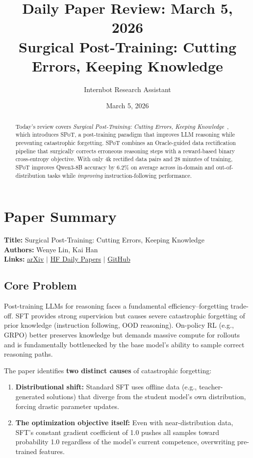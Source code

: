 \documentclass[11pt]{article}
\title{Daily Paper Review: March 5, 2026\\Surgical Post-Training: Cutting Errors, Keeping Knowledge}
\author{Internbot Research Assistant}
\date{March 5, 2026}
\begin{document}
\maketitle

\begin{abstract}
Today's review covers \emph{Surgical Post-Training: Cutting Errors, Keeping Knowledge}~\citep{lin2026spot}, which introduces SPoT, a post-training paradigm that improves LLM reasoning while preventing catastrophic forgetting. SPoT combines an Oracle-guided data rectification pipeline that surgically corrects erroneous reasoning steps with a reward-based binary cross-entropy objective. With only 4k rectified data pairs and 28 minutes of training, SPoT improves Qwen3-8B accuracy by 6.2\% on average across in-domain and out-of-distribution tasks while \emph{improving} instruction-following performance.
\end{abstract}

\section{Paper Summary}

\textbf{Title:} Surgical Post-Training: Cutting Errors, Keeping Knowledge\\
\textbf{Authors:} Wenye Lin, Kai Han\\
\textbf{Links:}
\href{https://arxiv.org/abs/2603.01683}{arXiv} $\mid$
\href{https://huggingface.co/papers/2603.01683}{HF Daily Papers} $\mid$
\href{https://github.com/Visual-AI/SPoT}{GitHub}

\subsection{Core Problem}

Post-training LLMs for reasoning faces a fundamental efficiency--forgetting trade-off. SFT provides strong supervision but causes severe catastrophic forgetting of prior knowledge (instruction following, OOD reasoning). On-policy RL (e.g., GRPO) better preserves knowledge but demands massive compute for rollouts and is fundamentally bottlenecked by the base model's ability to sample correct reasoning paths.

The paper identifies \textbf{two distinct causes} of catastrophic forgetting:
\begin{enumerate}
    \item \textbf{Distributional shift:} Standard SFT uses offline data (e.g., teacher-generated solutions) that diverge from the student model's own distribution, forcing drastic parameter updates.
    \item \textbf{The optimization objective itself:} Even with near-distribution data, SFT's constant gradient coefficient of 1.0 pushes all samples toward probability 1.0 regardless of the model's current competence, overwriting pre-trained features.
\end{enumerate}
\end{document}

